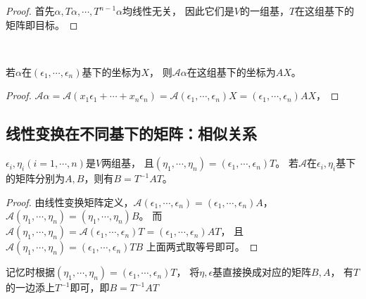 \begin{proof}
  首先$\alpha,T\alpha,\cdots,T^{n-1}\alpha$均线性无关，
  因此它们是$V$的一组基，$T$在这组基下的矩阵即目标。
\end{proof}

~

\begin{theorem}[线性变换后的坐标]
  若$\alpha$在$(\epsilon_1,\cdots,\epsilon_n)$基下的坐标为$X$，
  则$\mathcal{A}\alpha$在这组基下的坐标为$AX$。
\end{theorem}

\begin{proof}
  $\mathcal{A} \alpha = \mathcal{A}(x_1\epsilon_1 + \cdots + x_n\epsilon_n)
  = \mathcal{A}(\epsilon_1,\cdots,\epsilon_n)X 
  = (\epsilon_1,\cdots,\epsilon_n)AX$，
\end{proof}



\subsection{线性变换在不同基下的矩阵：相似关系}

\begin{theorem}[线性变换在不同基下的矩阵]
  $\epsilon_i,\eta_i(i = 1,\cdots,n)$是$V$两组基，
  且$(\eta_1,\cdots,\eta_n) = (\epsilon_1,\cdots,\epsilon_n)T$。
  若$\mathcal{A}$在$\epsilon_i,\eta_i$基下的矩阵分别为$A,B$，则有$B = T^{-1}AT$。
\end{theorem}

\begin{proof}
  由线性变换矩阵定义，$\mathcal{A}(\epsilon_1,\cdots,\epsilon_n) = (\epsilon_1,\cdots,\epsilon_n)A$，
  $\mathcal{A}(\eta_1,\cdots,\eta_n) = (\eta_1,\cdots,\eta_n)B$。
  而$\mathcal{A}(\eta_1,\cdots,\eta_n) = \mathcal{A}(\epsilon_1,\cdots,\epsilon_n)T = (\epsilon_1,\cdots,\epsilon_n)AT$，
  且$\mathcal{A}(\eta_1,\cdots,\eta_n) = (\epsilon_1,\cdots,\epsilon_n)TB$
  上面两式取等号即可。
\end{proof}

\begin{note}
  记忆时根据$(\eta_1,\cdots,\eta_n) = (\epsilon_1,\cdots,\epsilon_n)T$，
  将$\eta,\epsilon$基直接换成对应的矩阵$B,A$，
  有$T$的一边添上$T^{-1}$即可，即$B = T^{-1}AT$
\end{note}


~


